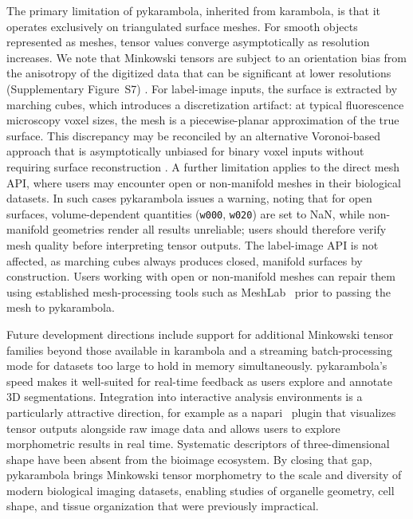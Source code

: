 \documentclass[unnumsec,webpdf,contemporary,large,namedate]{oup-authoring-template}
\begin{document}
The primary limitation of pykarambola, inherited from karambola, is that it operates exclusively on triangulated surface meshes.
For smooth objects represented as meshes, tensor values converge asymptotically as resolution increases.
We note that Minkowski tensors are subject to an orientation bias from the anisotropy of the digitized data that can be significant at lower resolutions (Supplementary Figure~S7) \citep{Svane2017}.
For label-image inputs, the surface is extracted by marching cubes, which introduces a discretization artifact: at typical fluorescence microscopy voxel sizes, the mesh is a piecewise-planar approximation of the true surface.
This discrepancy may be reconciled by an alternative Voronoi-based approach that is asymptotically unbiased for binary voxel inputs without requiring surface reconstruction  \citep{Hug2025}.
A further limitation applies to the direct mesh API, where users may encounter open or non-manifold meshes in their biological datasets.
In such cases pykarambola issues a warning, noting that for open surfaces, volume-dependent quantities (\texttt{w000}, \texttt{w020}) are set to NaN, while non-manifold geometries render all results unreliable; users should therefore verify mesh quality before interpreting tensor outputs.
The label-image API is not affected, as marching cubes always produces closed, manifold surfaces by construction.
Users working with open or non-manifold meshes can repair them using established mesh-processing tools such as MeshLab~\citep{Cignoni2008meshlab} prior to passing the mesh to pykarambola.

Future development directions include support for additional Minkowski tensor families beyond those available in karambola and a streaming batch-processing mode for datasets too large to hold in memory simultaneously.
pykarambola's speed makes it well-suited for real-time feedback as users explore and annotate 3D segmentations.
Integration into interactive analysis environments is a particularly attractive direction, for example as a napari~\citep{Sofroniew2026napari} plugin that visualizes tensor outputs alongside raw image data and allows users to explore morphometric results in real time.
Systematic descriptors of three-dimensional shape have been absent from the bioimage ecosystem. By closing that gap, pykarambola brings Minkowski tensor morphometry to the scale and diversity of modern biological imaging datasets, enabling studies of organelle geometry, cell shape, and tissue organization that were previously impractical.
\end{document}
